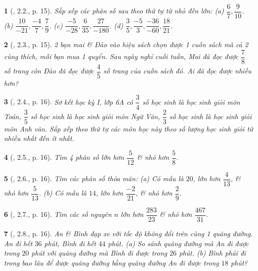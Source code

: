 \documentclass{article}
\newtheorem{baitoan}{}
\begin{document}
\begin{baitoan}[\cite{Binh_boi_duong_Toan_6_tap_2}, 2.2., p. 15]
	Sắp xếp các phân số sau theo thứ tự từ nhỏ đến lớn: (a) $\dfrac{6}{7},\dfrac{9}{10}$. (b) $\dfrac{10}{-21},\dfrac{-4}{7},\dfrac{7}{9}$. (c) $\dfrac{-5}{-28},\dfrac{6}{35},\dfrac{27}{-180}$. (d) $\dfrac{3}{5},\dfrac{-5}{3},\dfrac{-36}{-60},\dfrac{18}{21}$.
\end{baitoan}

\begin{baitoan}[\cite{Binh_boi_duong_Toan_6_tap_2}, 2.3., p. 15]
	2 bạn mai \& Đào vào hiệu sách chọn được 1 cuốn sách mà cả 2 cùng thích, mỗi bạn mua 1 quyển. Sau ngày nghỉ cuối tuần, Mai đã đọc được $\dfrac{7}{8}$ số trang còn Đào đã đọc được $\dfrac{4}{5}$ số trang của cuốn sách đó. Ai đã đọc được nhiều hơn?
\end{baitoan}

\begin{baitoan}[\cite{Binh_boi_duong_Toan_6_tap_2}, 2.4., p. 16]
	Sơ kết học kỳ I, lớp 6A có $\dfrac{3}{4}$ số học sinh là học sinh giỏi môn Toán, $\dfrac{3}{5}$ số học sinh là học sinh giỏi môn Ngữ Văn, $\dfrac{2}{3}$ số học sinh là học sinh giỏi môn Anh văn. Sắp xếp theo thứ tự các môn học này theo số lượng học sinh giỏi từ nhiều nhất đến ít nhất.
\end{baitoan}

\begin{baitoan}[\cite{Binh_boi_duong_Toan_6_tap_2}, 2.5., p. 16]
	Tìm 4 phân số lớn hơn $\dfrac{5}{12}$ \& nhỏ hơn $\dfrac{5}{8}$.
\end{baitoan}

\begin{baitoan}[\cite{Binh_boi_duong_Toan_6_tap_2}, 2.6., p. 16]
	Tìm các phân số thỏa mãn: (a) Có mẫu là $20$, lớn hơn $\dfrac{4}{13}$, \& nhỏ hơn $\dfrac{5}{13}$. (b) Có mẫu là $14$, lớn hơn $\dfrac{-2}{21}$, \& nhỏ hơn $\dfrac{2}{9}$.
\end{baitoan}

\begin{baitoan}[\cite{Binh_boi_duong_Toan_6_tap_2}, 2.7., p. 16]
	Tìm các số nguyên $n$ lớn hơn $\dfrac{283}{23}$ \& nhỏ hơn $\dfrac{467}{31}$.
\end{baitoan}

\begin{baitoan}[\cite{Binh_boi_duong_Toan_6_tap_2}, 2.8., p. 16]
	An \& Bình đạp xe với tốc độ không đổi trên cùng 1 quãng đường. An đi hết $36$ phút, Bình đi hết $44$ phút. (a) So sánh quãng đường mà An đi được trong $20$ phút với quãng đường mà Bình đi được trong $26$ phút. (b) Bình phải đi trong bao lâu để được quãng đường bằng quãng đường An đi được trong $18$ phút?
\end{baitoan}
\end{document}
